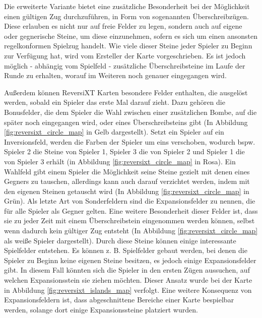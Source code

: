 \documentclass[12pt,a4paper,bibliography=totocnumbered,listof=totocnumbered]{article}
\begin{document}
Die erweiterte Variante bietet eine zusätzliche Besonderheit bei der Möglichkeit einen gültigen Zug durchzuführen, in Form von sogenannten Überschreibzügen. Diese erlauben es nicht nur auf freie Felder zu legen, sondern auch auf eigene oder gegnerische Steine, um diese einzunehmen, sofern es sich um einen ansonsten regelkonformen Spielzug handelt. Wie viele dieser Steine jeder Spieler zu Beginn zur Verfügung hat, wird vom Ersteller der Karte vorgeschrieben. Es ist jedoch möglich - abhängig vom Spielfeld - zusätzliche Überschreibsteine im Laufe der Runde zu erhalten, worauf im Weiteren noch genauer eingegangen wird. 

Außerdem können ReversiXT Karten besondere Felder enthalten, die ausgelöst werden, sobald ein Spieler das erste Mal darauf zieht. Dazu gehören die Bonusfelder, die dem Spieler die Wahl zwischen einer zusätzlichen Bombe, auf die später noch eingegangen wird, oder eines Überschreibsteins gibt (In Abbildung \ref{fig:reversixt_circle_map} in Gelb dargestellt). Setzt ein Spieler auf ein Inversionsfeld, werden die Farben der Spieler um eins verschoben, wodurch bspw. Spieler 2 die Steine von Spieler 1, Spieler 3 die von Spieler 2 und Spieler 1 die von Spieler 3 erhält (in Abbildung \ref{fig:reversixt_circle_map} in Rosa). Ein Wahlfeld gibt einem Spieler die Möglichkeit seine Steine gezielt mit denen eines Gegners zu tauschen, allerdings kann auch darauf verzichtet werden, indem mit den eigenen Steinen \glqq getauscht\grqq{} wird (In Abbildung \ref{fig:reversixt_circle_map} in Grün). Als letzte Art von Sonderfeldern sind die Expansionsfelder zu nennen, die für alle Spieler als Gegner gelten. Eine weitere Besonderheit dieser Felder ist, dass sie zu jeder Zeit mit einem Überschreibstein eingenommen werden können, selbst wenn dadurch kein gültiger Zug entsteht (In Abbildung \ref{fig:reversixt_circle_map} als weiße Spieler dargestellt). Durch diese Steine können einige interessante Spielfelder entstehen. Es können z. B. Spielfelder gebaut werden, bei denen die Spieler zu Beginn keine eigenen Steine besitzen, es jedoch einige Expansionsfelder gibt. In diesem Fall könnten sich die Spieler in den ersten Zügen aussuchen, auf welchen Expansionsstein sie ziehen möchten. Dieser Ansatz wurde bei der Karte in Abbildung \ref{fig:reversixt_islands_map} verfolgt. Eine weitere Konsequenz von Expansionsfeldern ist, dass abgeschnittene Bereiche einer Karte bespielbar werden, solange dort einige Expansionssteine platziert wurden.
\end{document}
